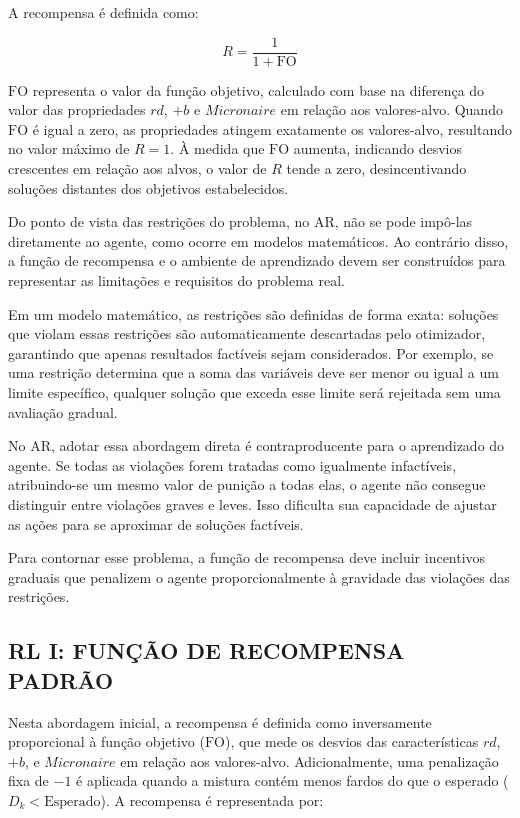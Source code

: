 \documentclass[
    12pt,                %
    openright,           %
    oneside,             %
    a4paper,             %
    english,             %
    spanish,             %
    brazil               %
]{ufscar}
\begin{document}
A recompensa é definida como:

\begin{equation}
    R = \frac{1}{1 + \text{FO}}
\end{equation}

$\text{FO}$ representa o valor da função objetivo, calculado com base na diferença do valor das propriedades $rd$, $+b$ e $Micronaire$ em relação aos valores-alvo. Quando $\text{FO}$ é igual a zero, as propriedades atingem exatamente os valores-alvo, resultando no valor máximo de $R = 1$. À medida que $\text{FO}$ aumenta, indicando desvios crescentes em relação aos alvos, o valor de $R$ tende a zero, desincentivando soluções distantes dos objetivos estabelecidos.

Do ponto de vista das restrições do problema, no AR, não se pode impô-las diretamente ao agente, como ocorre em modelos matemáticos. Ao contrário disso, a função de recompensa e o ambiente de aprendizado devem ser construídos para representar as limitações e requisitos do problema real.

Em um modelo matemático, as restrições são definidas de forma exata: soluções que violam essas restrições são automaticamente descartadas pelo otimizador, garantindo que apenas resultados factíveis sejam considerados. Por exemplo, se uma restrição determina que a soma das variáveis deve ser menor ou igual a um limite específico, qualquer solução que exceda esse limite será rejeitada sem uma avaliação gradual.

No AR, adotar essa abordagem direta é contraproducente para o aprendizado do agente. Se todas as violações forem tratadas como igualmente infactíveis, atribuindo-se um mesmo valor de punição a todas elas, o agente não consegue distinguir entre violações graves e leves. Isso dificulta sua capacidade de ajustar as ações para se aproximar de soluções factíveis.

Para contornar esse problema, a função de recompensa deve incluir incentivos graduais que penalizem o agente proporcionalmente à gravidade das violações das restrições.

\subsection{RL I: FUNÇÃO DE RECOMPENSA PADRÃO}

Nesta abordagem inicial, a recompensa é definida como inversamente proporcional à função objetivo (\( \text{FO} \)), que mede os desvios das características \(rd\), \(+b\), e \(Micronaire\) em relação aos valores-alvo. Adicionalmente, uma penalização fixa de \(-1\) é aplicada quando a mistura contém menos fardos do que o esperado (\(D_k < \text{Esperado}\)). A recompensa é representada por:
\end{document}
